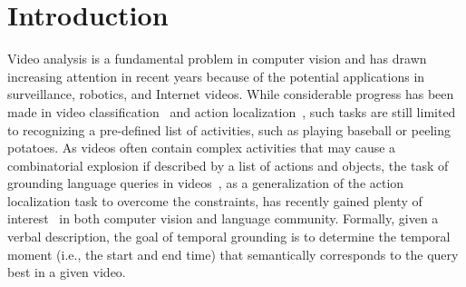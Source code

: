 \documentclass[letterpaper]{article} \usepackage{aaai22}  \usepackage{times}  \usepackage{helvet}  \usepackage{courier}  \usepackage[hyphens]{url}  \usepackage{graphicx} \urlstyle{rm} \def\UrlFont{\rm}  \usepackage{natbib}  \usepackage{caption} \DeclareCaptionStyle{ruled}{labelfont=normalfont,labelsep=colon,strut=off} \frenchspacing  \setlength{\pdfpagewidth}{8.5in}  \setlength{\pdfpageheight}{11in}  \usepackage{algorithm}
\begin{document}
\section{Introduction}
\label{sec:intro}
Video analysis is a fundamental problem in computer vision and has drawn increasing attention in recent years because of the potential applications in surveillance, robotics, and Internet videos. While considerable progress has been made in video classification~\cite{DBLP:conf/eccv/WangXW0LTG16,DBLP:conf/cvpr/WangL0G18,DBLP:conf/iccv/Feichtenhofer0M19,DBLP:conf/cvpr/0002TJW21} and action localization~\cite{DBLP:conf/iccv/ZhaoXWWTL17,DBLP:conf/iccv/LinLLDW19,DBLP:conf/eccv/LiW0W20}, such tasks are still limited to recognizing a pre-defined list of activities, such as playing baseball or peeling potatoes. As videos often contain complex activities that may cause a combinatorial explosion if described by a list of actions and objects, the task of grounding language queries in videos~\cite{DBLP:conf/iccv/HendricksWSSDR17,DBLP:conf/iccv/GaoSYN17,DBLP:journals/corr/abs-2011-05049}, as a generalization of the action localization task to overcome the constraints, has recently gained plenty of interest~\cite{DBLP:conf/aaai/HeZHLLW19,DBLP:conf/cvpr/ZhangDWWD19,DBLP:conf/cvpr/ZengXHCTG20,DBLP:conf/nips/YuanMWL019,DBLP:conf/aaai/ZhangPFL20,DBLP:journals/corr/abs-2011-05049} in both computer vision and language community. Formally, given a verbal description, the goal of temporal grounding is to determine the temporal moment (i.e., the start and end time) that semantically corresponds to the query best in a given video.
\end{document}
